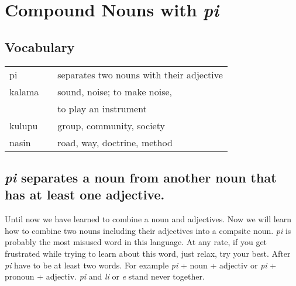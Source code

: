 \section{Compound Nouns with \textit{pi}}
%
\subsection*{Vocabulary}
%
\begin{supertabular}{p{5,5cm}|ll}
pi && separates two nouns with their adjective \\
kalama && sound, noise; to make noise, \\ && to play an instrument \\
kulupu && group, community, society \\
nasin && road, way, doctrine, method \\
\end{supertabular}  

\subsection*{\textit{pi} separates a noun from another noun that has at least one adjective.}

Until now we have learned to combine a noun and adjectives. 
Now we will learn how to combine two nouns including their adjectives into a compsite noun. 
\textit{pi} is probably the most misused word in this language. 
At any rate, if you get frustrated while trying to learn about this word, just relax, try your best. 
After \textit{pi} have to be at least two words. 
For example \textit{pi} + noun + adjectiv or \textit{pi} + pronoun + adjectiv. 
\textit{pi} and \textit{li} or \textit{e} stand never together.
%
